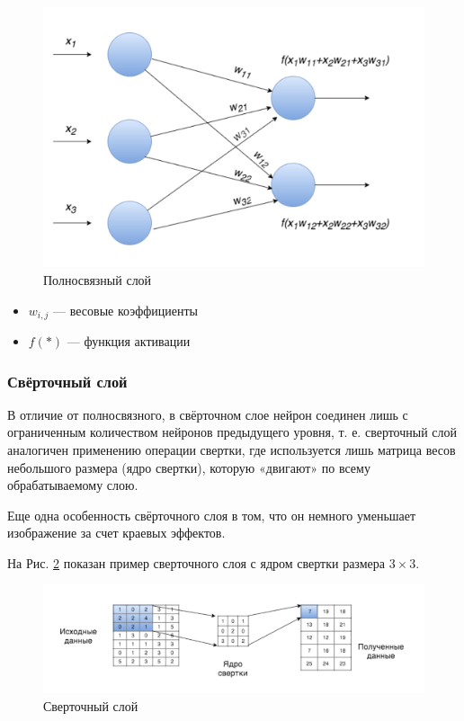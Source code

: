 \begin{figure}[ht]
    \centering
    \includegraphics [width=\textwidth*2/3] {images/fc_layer.png}
    \caption{Полносвязный слой}
    \label{fig:fc_layer}
\end{figure}

\begin{itemize}
    \item $w_{i,j}$ — весовые коэффициенты
    \item $f(*)$ — функция активации
\end{itemize}

\subsubsection{Свёрточный слой} \label{conv_layers}
В отличие от полносвязного, в свёрточном слое нейрон соединен лишь с ограниченным количеством нейронов предыдущего уровня, т. е. сверточный слой аналогичен применению операции свертки, где используется лишь матрица весов небольшого размера (ядро свертки), которую «двигают» по всему обрабатываемому слою.

Еще одна особенность свёрточного слоя в том, что он немного уменьшает изображение за счет краевых эффектов.

На Рис. \ref{fig:conv_layer} показан пример сверточного слоя с ядром свертки размера $3 \times 3$.
\begin{figure}[ht]
    \centering
    \includegraphics [width=\textwidth*2/3] {images/conv_layer.png}
    \caption{Сверточный слой}
    \label{fig:conv_layer}
\end{figure}

